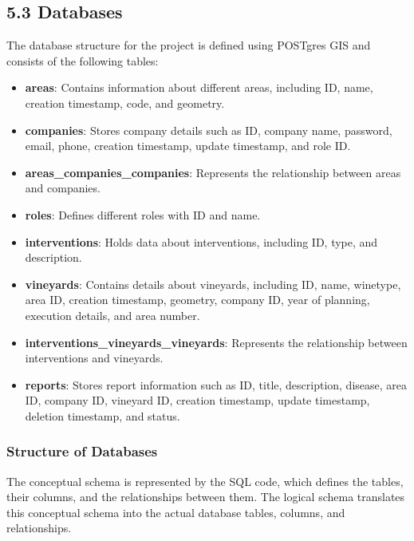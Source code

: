 \subsection{5.3 Databases}

The database structure for the project is defined using POSTgres GIS and consists of the following tables:

\begin{itemize}
    \item \textbf{areas}: Contains information about different areas, including ID, name, creation timestamp, code, and geometry.
    \item \textbf{companies}: Stores company details such as ID, company name, password, email, phone, creation timestamp, update timestamp, and role ID.
    \item \textbf{areas\_companies\_companies}: Represents the relationship between areas and companies.
    \item \textbf{roles}: Defines different roles with ID and name.
    \item \textbf{interventions}: Holds data about interventions, including ID, type, and description.
    \item \textbf{vineyards}: Contains details about vineyards, including ID, name, winetype, area ID, creation timestamp, geometry, company ID, year of planning, execution details, and area number.
    \item \textbf{interventions\_vineyards\_vineyards}: Represents the relationship between interventions and vineyards.
    \item \textbf{reports}: Stores report information such as ID, title, description, disease, area ID, company ID, vineyard ID, creation timestamp, update timestamp, deletion timestamp, and status.
\end{itemize}

\subsubsection{Structure of Databases}

The conceptual schema is represented by the SQL code, which defines the tables, their columns, and the relationships between them. The logical schema translates this conceptual schema into the actual database tables, columns, and relationships.

